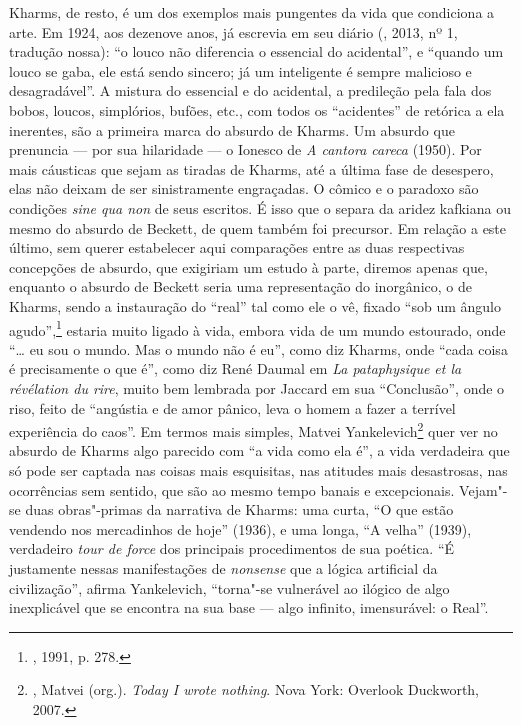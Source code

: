 Kharms, de resto, é um dos exemplos mais pungentes da vida que condiciona a arte.
Em 1924, aos dezenove anos, já escrevia em seu diário (, 2013, nº 1, tradução nossa): ``o
louco não diferencia o essencial do acidental'', e ``quando um louco se
gaba, ele está sendo sincero; já um inteligente é sempre malicioso e
desagradável''. A mistura do essencial e do acidental, a predileção pela
fala dos bobos, loucos, simplórios, bufões, etc., com todos os
``acidentes'' de retórica a ela inerentes, são a primeira marca do
absurdo de Kharms. Um absurdo que prenuncia --- por sua hilaridade --- o
Ionesco de \emph{A cantora careca} (1950). Por mais cáusticas que sejam 
as tiradas de Kharms, até a última fase de desespero, elas não deixam de
ser sinistramente engraçadas. O cômico e o paradoxo são condições
\emph{sine qua non} de seus escritos. É isso que o separa da aridez
kafkiana ou mesmo do absurdo de Beckett, de quem também foi precursor.
Em relação a este último, sem querer estabelecer aqui comparações entre
as duas respectivas concepções de absurdo, que exigiriam um estudo à
parte, diremos apenas que, enquanto o absurdo de Beckett seria uma
representação do inorgânico, o de Kharms, sendo a instauração do
``real'' tal como ele o vê, fixado ``sob um ângulo agudo'',\footnote{, 1991, p. 278.} estaria muito ligado à vida, embora vida de
um mundo estourado, onde ``\ldots{} eu sou o mundo. Mas o mundo não é eu'',
como diz Kharms, onde ``cada coisa é precisamente o que é'', como diz
René Daumal em \emph{La pataphysique et la révélation du rire}, muito
bem lembrada por Jaccard em sua ``Conclusão'', onde o riso, feito de
``angústia e de amor pânico, leva o homem a fazer a terrível experiência
do caos''. Em termos mais simples, Matvei 
Yankelevich\footnote{, Matvei (org.). \emph{Today I wrote nothing}. Nova York: Overlook Duckworth, 2007.} quer ver no absurdo de Kharms algo parecido com ``a vida como ela
é'', a vida verdadeira que só pode ser captada nas coisas mais
esquisitas, nas atitudes mais desastrosas, nas ocorrências sem sentido,
que são ao mesmo tempo banais e excepcionais. Vejam"-se duas obras"-primas
da narrativa de Kharms: uma curta, ``O que estão vendendo
nos mercadinhos de hoje'' (1936), e uma longa, ``A velha'' (1939),
verdadeiro \emph{tour de force} dos principais procedimentos de sua
poética. ``É justamente nessas manifestações de \emph{nonsense} que a
lógica artificial da civilização'', afirma Yankelevich, ``torna"-se
vulnerável ao ilógico de algo inexplicável que se encontra na sua base
--- algo infinito, imensurável: o Real''.

